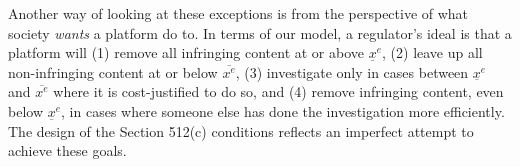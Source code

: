 Another way of looking at these exceptions is from the perspective of what society \emph{wants} a platform do to. In terms of our model, a regulator's ideal is that a platform will (1) remove all infringing content at or above $\underbar{x^e}$, (2) leave up all non-infringing content at or below $\overbar{x^e}$, (3) investigate only in cases between $\underbar{x^e}$ and $\overbar{x^e}$ where it is cost-justified to do so, and (4) remove infringing content, even below $\underbar{x^e}$, in cases where someone else has done the investigation more efficiently. The design of the Section 512(c) conditions reflects an imperfect attempt to achieve these goals.








